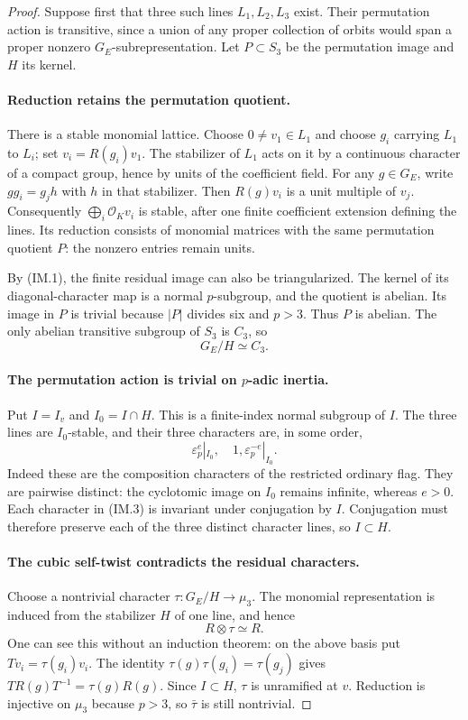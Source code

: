 \begin{proof}
Suppose first that three such lines $L_1,L_2,L_3$ exist.
Their permutation action is transitive, since a union of any
proper collection of orbits would span a proper nonzero
$G_E$-subrepresentation.  Let $P\subset S_3$ be the permutation
image and $H$ its kernel.

\paragraph{Reduction retains the permutation quotient.}
There is a stable monomial lattice.  Choose $0\ne v_1\in L_1$
and choose $g_i$ carrying $L_1$ to $L_i$; set $v_i=R(g_i)v_1$.
The stabilizer of $L_1$ acts on it by a continuous character
of a compact group, hence by units of the coefficient field.
For any $g\in G_E$, write $g g_i=g_j h$ with $h$ in that
stabilizer.  Then $R(g)v_i$ is a unit multiple of $v_j$.
Consequently $\bigoplus_i\mathcal O_K v_i$ is stable, after
one finite coefficient extension defining the lines.
Its reduction consists of monomial matrices with the same
permutation quotient $P$: the nonzero entries remain units.

By (IM.1), the finite residual image can also be triangularized.
The kernel of its diagonal-character map is a normal
$p$-subgroup, and the quotient is abelian.  Its image in $P$
is trivial because $|P|$ divides six and $p>3$.
Thus $P$ is abelian.  The only abelian transitive subgroup
of $S_3$ is $C_3$, so
\[
                          G_E/H\simeq C_3.                \tag{IM.2}
\]

\paragraph{The permutation action is trivial on $p$-adic inertia.}
Put $I=I_v$ and $I_0=I\cap H$.  This is a finite-index normal
subgroup of $I$.  The three lines are $I_0$-stable, and their
three characters are, in some order,
\[
                  \varepsilon_p^e|_{I_0},\quad1,
                              \varepsilon_p^{-e}|_{I_0}.  \tag{IM.3}
\]
Indeed these are the composition characters of the restricted
ordinary flag.  They are pairwise distinct: the cyclotomic
image on $I_0$ remains infinite, whereas $e>0$.
Each character in (IM.3) is invariant under conjugation by $I$.
Conjugation must therefore preserve each of the three distinct
character lines, so $I\subset H$.

\paragraph{The cubic self-twist contradicts the residual characters.}
Choose a nontrivial character
$\tau:G_E/H\to\mu_3$.  The monomial representation is induced
from the stabilizer $H$ of one line, and hence
\[
                              R\otimes\tau\simeq R.        \tag{IM.4}
\]
One can see this without an induction theorem: on the above
basis put $T v_i=\tau(g_i)v_i$.  The identity
$\tau(g)\tau(g_i)=\tau(g_j)$ gives
$T R(g)T^{-1}=\tau(g)R(g)$.
Since $I\subset H$, $\tau$ is unramified at $v$.
Reduction is injective on $\mu_3$ because $p>3$, so
$\bar\tau$ is still nontrivial.


\end{proof}
